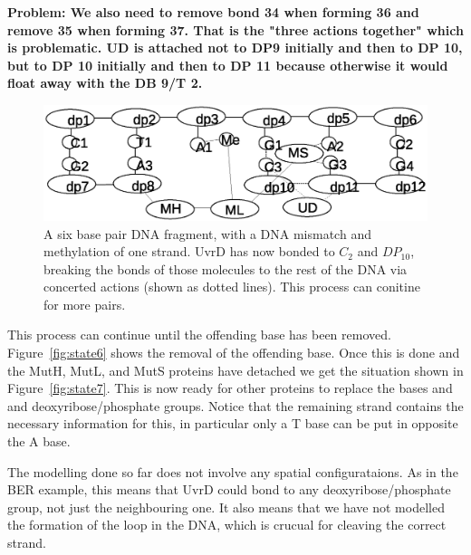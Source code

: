 \documentclass[review]{elsarticle}
\begin{document}
\textbf{Problem: We also need to remove bond 34 when forming 36 and remove 35 when forming 37. That is the "three actions together" which is problematic. UD is attached not to DP9 initially and then to DP 10, but to DP 10 initially and then to DP 11 because otherwise it would float away with the DB 9/T 2.}

\begin{figure}[h!]
  \centering
    \includegraphics[width=1.0\textwidth]{mmr/state4}
  \caption[A six base pair DNA fragment.]{A six base pair DNA fragment, with a DNA mismatch and methylation of one strand. UvrD has now bonded to $C_2$ and $DP_{10}$, breaking the bonds of those molecules to the rest of the DNA via concerted actions (shown as dotted lines). This process can conitine for more pairs.}
  \label{fig:state4}
\end{figure}

This process can continue until the offending base has been removed. Figure~\ref{fig:state6} shows the removal of the offending base. Once this is done and the MutH, MutL, and MutS proteins have detached we get the situation shown in Figure~\ref{fig:state7}. This is now ready for other proteins to replace the bases and and deoxyribose/phosphate groups. Notice that the remaining strand contains the necessary information for this, in particular only a T base can be put in opposite the A base.

The modelling done so far does not involve any spatial configurataions. As in the BER example, this means that UvrD could bond to any deoxyribose/phosphate group, not just the neighbouring one. It also means that we have not modelled the formation of the loop in the DNA, which is crucual for cleaving the correct strand.
\end{document}

